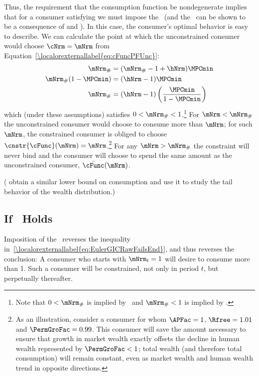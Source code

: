 \documentclass[\econtexRoot/BufferStockTheory]{subfiles}
\begin{document}
Thus, the requirement that the consumption function be nondegenerate
implies that for a consumer satisfying \cncl{\GICRaw} we must impose
the \RIC~(and the \FHWC~can be shown to be a consequence of \cncl{\GICRaw} and \RIC).  In
this case, the consumer's optimal behavior is easy to describe.  We
can calculate the point at which the unconstrained consumer would
choose $\cNrm = \mNrm$ from Equation~\eqref{\localorexternallabel{eq:cFuncPFUnc}}:
\begin{equation}\begin{gathered}\begin{aligned}
  \mNrm_{\#}  & = (\mNrm_{\#}-1+\hNrm)\MPCmin
  \\ \mNrm_{\#}(1-\MPCmin)  & = (\hNrm - 1)\MPCmin
  \\ \mNrm_{\#}  & = (\hNrm - 1)\left(\frac{\MPCmin}{1-\MPCmin}\right)
\end{aligned}\end{gathered}\end{equation}
which (under these assumptions) satisfies $0 < \mNrm_{\#} < 1$.\footnote{Note that $0 < \mNrm_{\#}$ is implied by \RIC~and $ \mNrm_{\#}<1$ is implied by \cncl{\GICRaw}.}  For
$\mNrm < \mNrm_{\#}$ the unconstrained consumer would choose to
consume more than $\mNrm$; for such $\mNrm$, the constrained consumer
is obliged to choose $\cnstr{\cFunc}(\mNrm) = \mNrm$.\footnote{As an
  illustration, consider a consumer for whom $\APFac = 1$, $\Rfree
  =1.01$ and $\PermGroFac = 0.99$.  This consumer will save the amount
  necessary to ensure that growth in market wealth exactly offsets the
  decline in human wealth represented by $\PermGroFac < 1$; total wealth
  (and therefore total consumption) will remain constant, even as
  market wealth and human wealth trend in opposite directions.}  For
any $\mNrm > \mNrm_{\#}$ the constraint will never bind and the
consumer will choose to spend the same amount as the unconstrained
consumer, $\bar{\cFunc}(\mNrm)$.

(\cite{StachurskiToda2019JET} obtain a similar lower bound on consumption and use it to study the tail behavior of the wealth distribution.)


\subsection{If \GICRaw~Holds}

Imposition of the \GICRaw~reverses the inequality in~\eqref{\localorexternallabel{eq:EulerGICRawFailsEnd}}, and thus reverses the conclusion: A consumer who starts with $\mNrm_{t}=1$ will desire to consume more than 1.  Such a consumer will be constrained, not only in period $t$, but perpetually thereafter.
\end{document}
